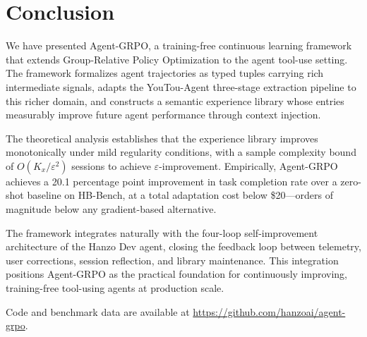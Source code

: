 \section{Conclusion}

\label{sec:conclusion}

We have presented Agent-GRPO, a training-free continuous learning framework
that extends Group-Relative Policy Optimization to the agent tool-use setting.
The framework formalizes agent trajectories as typed tuples carrying rich
intermediate signals, adapts the YouTou-Agent three-stage extraction pipeline
to this richer domain, and constructs a semantic experience library whose
entries measurably improve future agent performance through context injection.

The theoretical analysis establishes that the experience library improves
monotonically under mild regularity conditions, with a sample complexity bound
of $O(K_x/\varepsilon^2)$ sessions to achieve $\varepsilon$-improvement.
Empirically, Agent-GRPO achieves a 20.1 percentage point improvement in task
completion rate over a zero-shot baseline on HB-Bench, at a total adaptation
cost below \$20---orders of magnitude below any gradient-based alternative.

The framework integrates naturally with the four-loop self-improvement
architecture of the Hanzo Dev agent, closing the feedback loop between
telemetry, user corrections, session reflection, and library maintenance.
This integration positions Agent-GRPO as the practical foundation for
continuously improving, training-free tool-using agents at production scale.

Code and benchmark data are available at \url{https://github.com/hanzoai/agent-grpo}.

